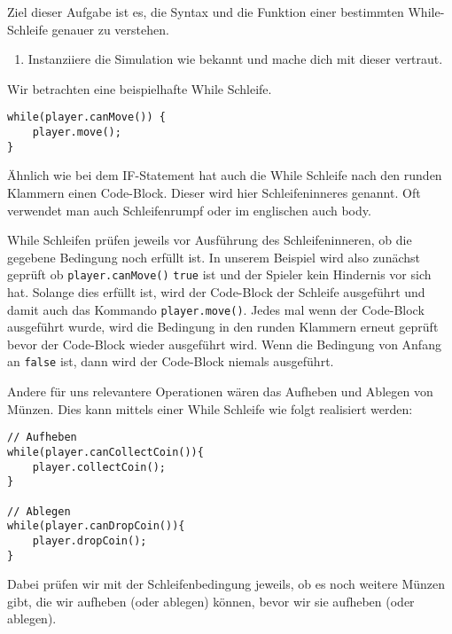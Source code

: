 

Ziel dieser Aufgabe ist es, die Syntax und die Funktion einer bestimmten While-Schleife genauer zu verstehen.

\begin{enumerate}
    \item Instanziiere die Simulation wie bekannt und mache dich mit dieser vertraut.
\end{enumerate}


\begin{Infobox}
    Wir betrachten eine beispielhafte While Schleife.

    \begin{lstlisting}[breaklines=true, numbers=none]
while(player.canMove()) {
    player.move();
}
    \end{lstlisting}

    Ähnlich wie bei dem IF-Statement hat auch die While Schleife nach den runden Klammern einen Code-Block.
    Dieser wird hier Schleifeninneres genannt.
    Oft verwendet man auch Schleifenrumpf oder im englischen auch body.

    While Schleifen prüfen jeweils vor Ausführung des Schleifeninneren, ob die gegebene Bedingung noch erfüllt ist. 
    In unserem Beispiel wird also zunächst geprüft ob \lstinline{player.canMove()} \lstinline{true} ist und der Spieler kein Hindernis vor sich hat. 
    Solange dies erfüllt ist, wird der Code-Block der Schleife ausgeführt und damit auch das Kommando \lstinline{player.move()}.
    Jedes mal wenn der Code-Block ausgeführt wurde, wird die Bedingung in den runden Klammern erneut geprüft bevor der Code-Block wieder ausgeführt wird.
    Wenn die Bedingung von Anfang an \lstinline{false} ist, dann wird der Code-Block niemals ausgeführt.
    
    Andere für uns relevantere Operationen wären das Aufheben und Ablegen von Münzen. 
    Dies kann mittels einer While Schleife wie folgt realisiert werden:

    \begin{lstlisting}[breaklines=true, numbers=none]
// Aufheben
while(player.canCollectCoin()){
    player.collectCoin();
}

// Ablegen
while(player.canDropCoin()){
    player.dropCoin();
}
    \end{lstlisting}

    Dabei prüfen wir mit der Schleifenbedingung jeweils, ob es noch weitere Münzen gibt, die wir aufheben (oder ablegen) können, bevor wir sie aufheben (oder ablegen).
\end{Infobox}


